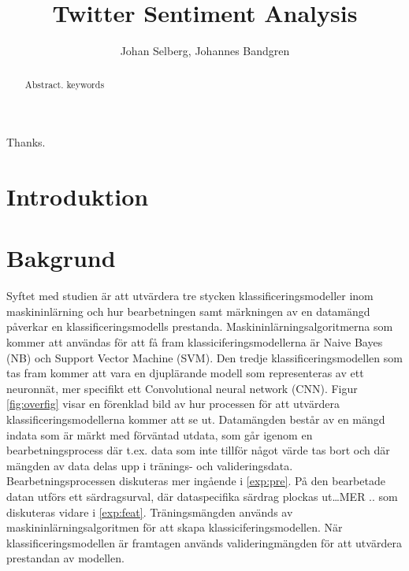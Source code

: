 \documentclass{kaumasters} %
\title{Twitter Sentiment Analysis}
\author{Johan Selberg, Johannes Bandgren}
\institute{Department of Computer Science}
\begin{document}
\maketitle


\frontmatter
\begin{abstract}
  Abstract.
  \keywords keywords
\end{abstract}
\approvalpage%
\begin{acknowledgements}
  Thanks.
\end{acknowledgements}

\tableofcontents{}
\listoffigures
\listoftables

\mainmatter
\pagestyle{fancy}
\fancyhead[LE,RO]{\thepage}
\fancyhead[RE,LO]{\rightmark}
\fancyfoot{}
\chapter{Introduktion}

\newpage


\chapter{Bakgrund}
Syftet med studien är att utvärdera tre stycken klassificeringsmodeller inom maskininlärning och hur bearbetningen samt märkningen av en datamängd påverkar en klassificeringsmodells prestanda. Maskininlärningsalgoritmerna som kommer att användas för att få fram klassiciferingsmodellerna är Naive Bayes (NB) och Support Vector Machine  (SVM). Den tredje klassificeringsmodellen som tas fram kommer att vara en djuplärande modell  som representeras av ett neuronnät, mer specifikt ett Convolutional neural network (CNN). Figur \ref{fig:overfig} visar en förenklad bild av hur processen för att utvärdera klassificeringsmodellerna kommer att se ut. Datamängden består av en mängd indata som är märkt med förväntad utdata, som går igenom en bearbetningsprocess där t.ex. data som inte tillför något värde tas bort och där mängden av data delas upp i tränings- och valideringsdata.  Bearbetningsprocessen diskuteras mer ingående i \ref{exp:pre}. På den bearbetade datan utförs ett särdragsurval, där dataspecifika särdrag plockas ut…MER .. som diskuteras vidare i \ref{exp:feat}. Träningsmängden används av maskininlärningsalgoritmen för att skapa klassiciferingsmodellen. När klassificeringsmodellen är framtagen används valideringmängden för att utvärdera prestandan av modellen.
\end{document}
